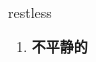 
\begin{frame}
{\huge restless}
\begin{center}
\begin{enumerate}\Large
  \item \textbf{不平静的}
\end{enumerate}
\end{center}
\end{frame}
